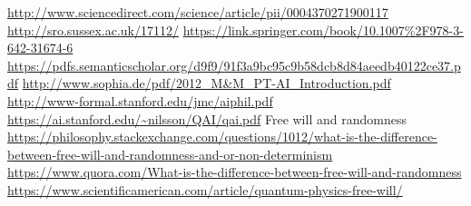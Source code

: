 \documentclass[a4paper]{article}
\begin{document}
\begin{thebibliography}{20}
 \url{http://www.sciencedirect.com/science/article/pii/0004370271900117}
 \url{http://sro.sussex.ac.uk/17112/}
 \url{https://link.springer.com/book/10.1007\%2F978-3-642-31674-6}
 \url{https://pdfs.semanticscholar.org/d9f9/91f3a9bc95c9b58dcb8d84aeedb40122ce37.pdf}
 \url{http://www.sophia.de/pdf/2012_M&M_PT-AI_Introduction.pdf}
 \url{http://www-formal.stanford.edu/jmc/aiphil.pdf}
 \url{https://ai.stanford.edu/~nilsson/QAI/qai.pdf}
 Free will and randomness \url{https://philosophy.stackexchange.com/questions/1012/what-is-the-difference-between-free-will-and-randomness-and-or-non-determinism} \url{https://www.quora.com/What-is-the-difference-between-free-will-and-randomness} \url{https://www.scientificamerican.com/article/quantum-physics-free-will/}
\end{thebibliography}
\end{document}
